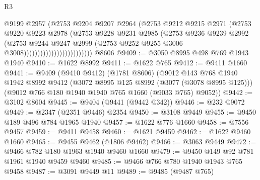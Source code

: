 \begin{lexlean}{R3}
\begin{coremodule}
                                        @9199
                                        @2957
                                        (@2753
                                          @9204
                                          @9207
                                          @2964
                                          (@2753
                                            @9212
                                            @9215
                                            @2971
                                            (@2753
                                              @9220
                                              @9223
                                              @2978
                                              (@2753
                                                @9228
                                                @9231
                                                @2985
                                                (@2753
                                                  @9236
                                                  @9239
                                                  @2992
                                                  (@2753
                                                    @9244
                                                    @9247
                                                    @2999
                                                    (@2753
                                                      @9252
                                                      @9255
                                                      @3006
                                                      @3008)))))))))))))))))))))))))
    @8606
@9409 := @3050 @8995 @498 @769 @1943 @1940
@9410 := @1622 @8992
@9411 := @1622 @765
@9412 := @9411 @1660
@9441 := @9409
    (@9410 @9412)
    (@1781 @8606)
    (@9012
      @143
      @768
      @1940
      @1942
      @8992
      @9412
      (@3072 @8995 @125 @8992 (@3077 (@3078 @8995 @125)))
      (@9012 @766 @180 @1940 @1940 @765 @1660 (@9033 @765) @9052))
@9442 := @3102 @8604
@9445 := @9404 (@9441 (@9442 @342))
@9446 := @232 @9072
@9449 := @2347 (@2351 @9446) @2354
@9450 := @3108 @9449
@9455 := @9450 @189 @496 @784 @1965 @1940
@9457 := @1622 @776 @1660
@9458 := @7556 @9457
@9459 := @9411 @9458
@9460 := @1621 @9459
@9462 := @1622 @9460 @1660
@9465 := @9455 @9462 (@1806 @9462)
@9466 := @3063 @9449
@9472 := @9466 @782 @180 @1963 @1940 @9460 @1660
@9479 := @9450 @149 @92 @781 @1961 @1940 @9459 @9460
@9485 := @9466 @766 @780 @1940 @1943 @765 @9458
@9487 := @3091 @9449 @11
@9489 := @9485 (@9487 @765)

\end{coremodule}
\end{lexlean}
